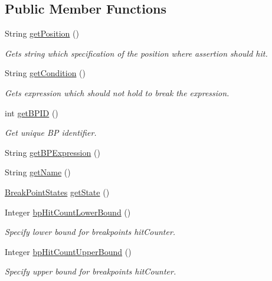 \subsection*{Public Member Functions}
\begin{DoxyCompactItemize}
\item 
String \hyperlink{interfacegov_1_1nasa_1_1jpf_1_1inspector_1_1interfaces_1_1_assert_create_a61a47b677f13657fc7d6b81d605c8133}{get\+Position} ()
\begin{DoxyCompactList}\small\item\em Gets string which specification of the position where assertion should hit. \end{DoxyCompactList}\item 
String \hyperlink{interfacegov_1_1nasa_1_1jpf_1_1inspector_1_1interfaces_1_1_assert_create_a69127890ec21b8d0e8ca77c146196211}{get\+Condition} ()
\begin{DoxyCompactList}\small\item\em Gets expression which should not hold to break the expression. \end{DoxyCompactList}\item 
int \hyperlink{interfacegov_1_1nasa_1_1jpf_1_1inspector_1_1interfaces_1_1_break_point_creation_information_a261d8c7de48f0776fbe0b4222c568070}{get\+B\+P\+ID} ()
\begin{DoxyCompactList}\small\item\em Get unique BP identifier. \end{DoxyCompactList}\item 
String \hyperlink{interfacegov_1_1nasa_1_1jpf_1_1inspector_1_1interfaces_1_1_break_point_creation_information_aa7da9b019da9ee304abd59759f73d14e}{get\+B\+P\+Expression} ()
\item 
String \hyperlink{interfacegov_1_1nasa_1_1jpf_1_1inspector_1_1interfaces_1_1_break_point_creation_information_a3417b55955320c81f68b2f2dc5eef7d9}{get\+Name} ()
\item 
\hyperlink{enumgov_1_1nasa_1_1jpf_1_1inspector_1_1interfaces_1_1_break_point_states}{Break\+Point\+States} \hyperlink{interfacegov_1_1nasa_1_1jpf_1_1inspector_1_1interfaces_1_1_break_point_creation_information_af471d172e5a442597709b20afe3d28e4}{get\+State} ()
\item 
Integer \hyperlink{interfacegov_1_1nasa_1_1jpf_1_1inspector_1_1interfaces_1_1_break_point_creation_information_a0732dfa7c7e94e3e28e7348a0594702b}{bp\+Hit\+Count\+Lower\+Bound} ()
\begin{DoxyCompactList}\small\item\em Specify lower bound for breakpoint\textquotesingle{}s hit\+Counter. \end{DoxyCompactList}\item 
Integer \hyperlink{interfacegov_1_1nasa_1_1jpf_1_1inspector_1_1interfaces_1_1_break_point_creation_information_a62389a60ba0878868c893d0a3d2efe56}{bp\+Hit\+Count\+Upper\+Bound} ()
\begin{DoxyCompactList}\small\item\em Specify upper bound for breakpoint\textquotesingle{}s hit\+Counter. \end{DoxyCompactList}\end{DoxyCompactItemize}

